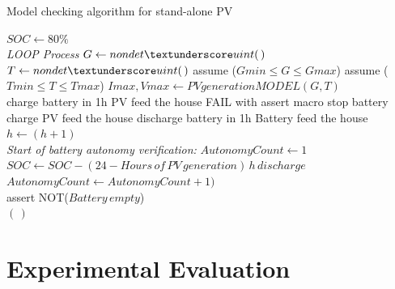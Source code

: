 \documentclass[runningheads]{llncs}
\begin{document}
 \begin{algorithm}
 \caption{Model checking algorithm for stand-alone PV}
 \begin{algorithmic}[1]
 \renewcommand{\algorithmicrequire}{\textbf{Input:}}
 \renewcommand{\algorithmicensure}{\textbf{Output:}}
  \STATE $SOC \leftarrow 80\%$ \\
 \textit{LOOP Process}
  \STATE $G \leftarrow nondet \textunderscore uint(\,)$ 
  \STATE $T \leftarrow nondet \textunderscore uint(\,)$ 
  \STATE assume ($Gmin \leq G \leq Gmax$) 
  \STATE assume ($Tmin \leq T \leq Tmax$) 
  \STATE $Imax, Vmax \leftarrow PVgenerationMODEL (G,T)$ 
  \\
    \STATE charge battery in 1h
    \STATE PV feed the house
    \STATE FAIL with assert macro
    \STATE stop battery charge
    \STATE PV feed the house
    \STATE discharge battery in 1h
    \STATE Battery feed the house
  \ENDIF
  \STATE $h \leftarrow (h+1)$
  \ENDFOR
 \\ \textit{Start of battery autonomy verification:}
\STATE $AutonomyCount \leftarrow 1$
  \STATE $SOC \leftarrow SOC - ( 24 - Hours \, of \, PV \, generation)\,h\, discharge$
  \STATE $AutonomyCount \leftarrow AutonomyCount+1)$
  \\  
  \STATE assert NOT($Battery \, empty$)  
  \\
  \ENDWHILE
 \RETURN $(\,)$ 
 \end{algorithmic} 
 \label{alg:verification-algorithm}
 \end{algorithm}

\section{Experimental Evaluation} 
\label{sec:results}
\end{document}
